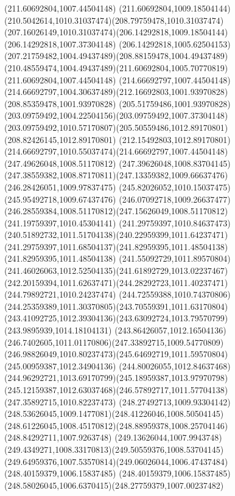 {{		\moveto(211.60692804,1007.44504148)
		\curveto(211.60692804,1009.18504144)(210.5042614,1010.31037474)(208.79759478,1010.31037474)
		\curveto(207.16026149,1010.31037474)(206.14292818,1009.18504144)(206.14292818,1007.37304148)
		\curveto(206.14292818,1005.62504153)(207.21759482,1004.49437489)(208.88159478,1004.49437489)
		\curveto(210.48559474,1004.49437489)(211.60692804,1005.70770819)(211.60692804,1007.44504148)
		\moveto(214.66692797,1007.44504148)
		\curveto(214.66692797,1004.30637489)(212.16692803,1001.93970828)(208.85359478,1001.93970828)
		\curveto(205.51759486,1001.93970828)(203.09759492,1004.22504156)(203.09759492,1007.37304148)
		\curveto(203.09759492,1010.57170807)(205.50559486,1012.89170801)(208.82426145,1012.89170801)
		\curveto(212.15492803,1012.89170801)(214.66692797,1010.55037474)(214.66692797,1007.44504148)
		\moveto(247.49626048,1008.51170812)
		\lineto(247.39626048,1008.83704145)
		\curveto(247.38559382,1008.87170811)(247.13359382,1009.66637476)(246.28426051,1009.97837475)
		\lineto(245.82026052,1010.15037475)
		\lineto(245.95492718,1009.67437476)
		\curveto(246.07092718,1009.26637477)(246.28559384,1008.51170812)(247.15626049,1008.51170812)
		\closepath
		\moveto(241.19759397,1010.45304141)
		\curveto(241.29759397,1010.84637473)(240.51892732,1011.51704138)(240.22959399,1011.64237471)
		\curveto(241.29759397,1011.68504137)(241.82959395,1011.48504138)(241.82959395,1011.48504138)
		\curveto(241.55092729,1011.89570804)(241.46026063,1012.52504135)(241.61892729,1013.02237467)
		\curveto(242.20159394,1011.62637471)(244.28292723,1011.40237471)(244.79892721,1010.24237474)
		\curveto(244.72559388,1010.74370806)(244.25359389,1011.30370805)(243.70559391,1011.63170804)
		\curveto(243.41092725,1012.39304136)(243.63092724,1013.79570799)(243.9895939,1014.18104131)
		\curveto(243.86426057,1012.16504136)(246.7402605,1011.01170806)(247.33892715,1009.54770809)
		\curveto(246.98826049,1010.80237473)(245.64692719,1011.59570804)(245.00959387,1012.34904136)
		\curveto(244.80026055,1012.84637468)(244.96292721,1013.69170799)(245.18959387,1013.97970798)
		\curveto(245.12159387,1012.63037468)(246.57892717,1011.57704138)(247.35892715,1010.82237473)
		\curveto(248.27492713,1009.93304142)(248.53626045,1009.1477081)(248.41226046,1008.50504145)
		\curveto(248.61226045,1008.45170812)(248.88959378,1008.25704146)(248.84292711,1007.9263748)
		\curveto(249.13626044,1007.9943748)(249.4349271,1008.33170813)(249.50559376,1008.53704145)
		\curveto(249.64959376,1007.53570814)(249.06026044,1006.47437484)(248.40159379,1006.15837485)
		\curveto(248.40159379,1006.15837485)(248.58026045,1006.6370415)(248.27759379,1007.00237482)
}}
